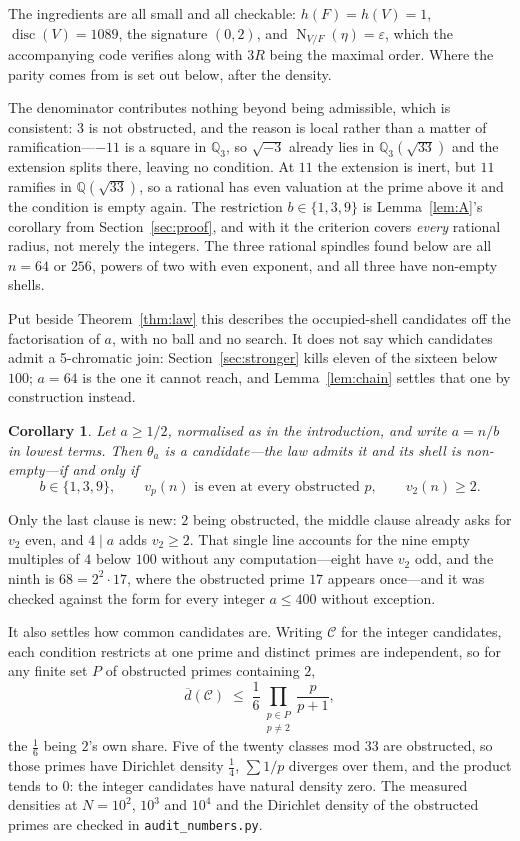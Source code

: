 \documentclass[11pt,reqno]{amsart}
\theoremstyle{plain}
\newtheorem{corollary}[theorem]{Corollary}
\theoremstyle{definition}
\newcommand{\Q}{\mathbb{Q}}
\newcommand{\Lat}{R}
\DeclareMathOperator{\Nm}{N}
\begin{document}
The ingredients are all small and all checkable: $h(F) = h(V) = 1$,
$\operatorname{disc}(V) = 1089$, the signature $(0,2)$, and
$\Nm_{V/F}(\eta) = \varepsilon$, which the accompanying code verifies along with
$3\Lat$ being the maximal order.
Where the parity comes from is set out below, after the density.

The denominator contributes nothing beyond being admissible, which is consistent:
$3$ is not obstructed, and the reason is local rather than a matter of
ramification---$-11$ is a square in $\Q_3$, so $\sqrt{-3}$ already lies in
$\Q_3(\sqrt{33})$ and the extension splits there, leaving no condition. At $11$ the
extension is inert, but $11$ ramifies in $\Q(\sqrt{33})$, so a rational has even
valuation at the prime above it and the condition is empty again. The restriction $b \in \{1,3,9\}$ is Lemma~\ref{lem:A}'s corollary from
Section~\ref{sec:proof}, and with it the criterion covers \emph{every} rational
radius, not merely the integers. The three rational spindles found below are all
$n = 64$ or $256$, powers of two with even
exponent, and all three have non-empty shells.

Put beside Theorem~\ref{thm:law} this describes the occupied-shell candidates off
the factorisation of $a$, with no ball and no search. It does not say which
candidates admit a 5-chromatic join: Section~\ref{sec:stronger}
kills eleven of the sixteen below $100$; $a = 64$ is the one it cannot reach,
and Lemma~\ref{lem:chain} settles that one by construction instead.

\begin{corollary}\label{cor:closed}
Let $a \ge 1/2$, normalised as in the introduction, and write $a = n/b$ in
lowest terms. Then $\theta_a$ is a candidate---the law admits it and its shell is
non-empty---if and only if
\[
  b \in \{1,3,9\},
  \qquad
  v_p(n) \text{ is even at every obstructed } p,
  \qquad
  v_2(n) \ge 2 .
\]
\end{corollary}

Only the last clause is new: $2$ being obstructed, the middle clause already asks
for $v_2$ even, and $4 \mid a$ adds $v_2 \ge 2$. That single line accounts for the
nine empty multiples of $4$ below $100$ without any computation---eight have
$v_2$ odd, and the ninth is $68 = 2^2\cdot17$, where the obstructed prime $17$
appears once---and it was checked against the form for every integer $a \le 400$
without exception.

It also settles how common candidates are. Writing $\mathcal C$ for the integer
candidates, each condition restricts at one prime and distinct primes are
independent, so for any finite set $P$ of obstructed primes containing $2$,
\[
  \overline d(\mathcal C) \;\le\; \frac16 \prod_{\substack{p \in P \\ p \ne 2}}
  \frac{p}{p+1},
\]
the $\tfrac16$ being $2$'s own share. Five of the twenty classes mod $33$ are
obstructed, so those primes have Dirichlet density $\tfrac14$, $\sum 1/p$
diverges over them, and the product tends to $0$: the integer candidates have
natural density zero. The measured densities at $N = 10^2$, $10^3$ and $10^4$ and the Dirichlet
density of the obstructed primes are checked in \texttt{audit\_numbers.py}.
\end{document}
